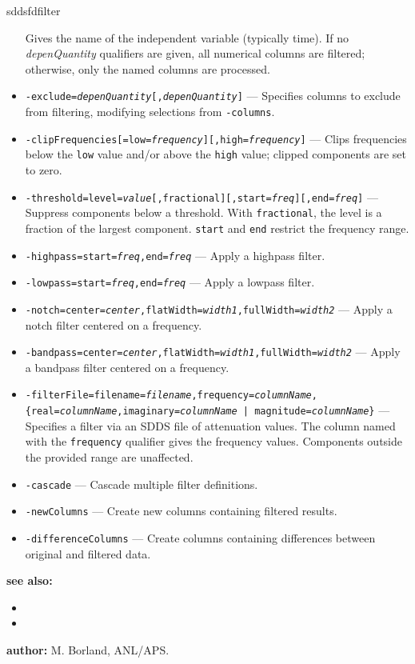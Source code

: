 \begin{sddsprog}{sddsfdfilter}
\begin{itemize}
      Gives the name of the independent variable (typically time).  If no
      {\em depenQuantity} qualifiers are given, all numerical columns are filtered;
      otherwise, only the named columns are processed.
    \item {\tt -exclude={\em depenQuantity}[,{\em depenQuantity}]} --- Specifies columns to
      exclude from filtering, modifying selections from {\tt -columns}.
    \item {\tt -clipFrequencies[=low={\em frequency}][,high={\em frequency}]} --- Clips
      frequencies below the {\tt low} value and/or above the {\tt high} value; clipped
      components are set to zero.
    \item {\tt -threshold=level={\em value}[,fractional][,start={\em freq}][,end={\em freq}]} ---
      Suppress components below a threshold.  With {\tt fractional}, the level is a
      fraction of the largest component.  {\tt start} and {\tt end} restrict the
      frequency range.
    \item {\tt -highpass=start={\em freq},end={\em freq}} --- Apply a highpass filter.
    \item {\tt -lowpass=start={\em freq},end={\em freq}} --- Apply a lowpass filter.
    \item {\tt -notch=center={\em center},flatWidth={\em width1},fullWidth={\em width2}} ---
      Apply a notch filter centered on a frequency.
    \item {\tt -bandpass=center={\em center},flatWidth={\em width1},fullWidth={\em width2}} ---
      Apply a bandpass filter centered on a frequency.
    \item {\tt -filterFile=filename={\em filename},frequency={\em columnName},}
      {\tt \{real={\em columnName},imaginary={\em columnName} | magnitude={\em columnName}\}} ---
      Specifies a filter via an SDDS file of attenuation values.  The column named
      with the {\tt frequency} qualifier gives the frequency values.  Components
      outside the provided range are unaffected.
    \item {\tt -cascade} --- Cascade multiple filter definitions.
    \item {\tt -newColumns} --- Create new columns containing filtered results.
    \item {\tt -differenceColumns} --- Create columns containing differences between
      original and filtered data.
    \end{itemize}
  \item \textbf{see also:}
    \begin{itemize}
    \item {}
    \item {}
    \end{itemize}
  \item \textbf{author:} M. Borland, ANL/APS.
\end{sddsprog}

